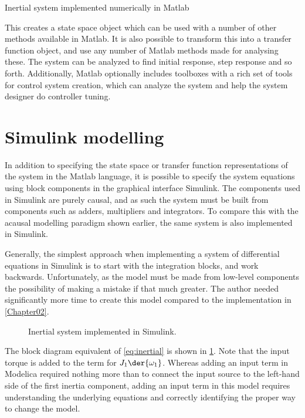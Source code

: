 \documentclass[\rootfolder/main.tex]{subfiles}
\begin{document}
\begin{listing}[ht]
    \inputminted[fontsize=\footnotesize, firstline=1, lastline=9]{matlab}{\rootfolder/Models/Matlab/InertialMatlab.m}
    \caption{Inertial system implemented numerically in Matlab\label{lst:inertialmatlab}}
\end{listing}

This creates a state space object which can be used with a number of other methods available in Matlab.
It is also possible to transform this into a transfer function object, and use any number of Matlab methods made for analysing these.
The system can be analyzed to find initial response, step response and so forth.
Additionally, Matlab optionally includes toolboxes with a rich set of tools for control system creation, which can analyze the system and help the system designer do controller tuning.

\section{Simulink modelling}

In addition to specifying the state space or transfer function representations of the system in the Matlab language, it is possible to specify
the system equations using block components in the graphical interface Simulink.
The components used in Simulink are purely causal, and as such the system must be built from components such as adders, multipliers and integrators.
To compare this with the acausal modelling paradigm shown earlier, the same system is also implemented in Simulink.

Generally, the simplest approach when implementing a system of differential equations in Simulink is to start with the integration blocks, and work backwards.
Unfortunately, as the model must be made from low-level components the possibility of making a mistake if that much greater.
The author needed significantly more time to create this model compared to the implementation in \ref{Chapter02}.

\begin{figure}[ht]
    \centering
    \tiny
    
    \caption{Inertial system implemented in Simulink.\label{fig:inertial-simulink}}
\end{figure}

The block diagram equivalent of \cref{eq:inertial} is shown in \cref{fig:inertial-simulink}.
Note that the input torque is added to the term for $J_{1} \der{\omega_{1}}$.
Whereas adding an input term in Modelica required nothing more than to connect the input source to the left-hand side of the first inertia component,
adding an input term in this model requires understanding the underlying equations and correctly identifying the proper way to change the model.
\end{document}
